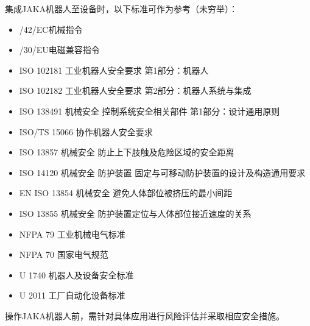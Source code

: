 \documentclass[a4paper,11pt,english,openany,oneside]{sphinxmanual}
\begin{document}
\sphinxAtStartPar
集成JAKA机器人至设备时，以下标准可作为参考（未穷举）：
\begin{itemize}
\item {} 
/42/EC机械指令

\item {} 
/30/EU电磁兼容指令

\item {} 
\sphinxAtStartPar
ISO 10218\sphinxhyphen{}1 工业机器人安全要求 第1部分：机器人

\item {} 
\sphinxAtStartPar
ISO 10218\sphinxhyphen{}2 工业机器人安全要求 第2部分：机器人系统与集成

\item {} 
\sphinxAtStartPar
ISO 13849\sphinxhyphen{}1 机械安全 控制系统安全相关部件 第1部分：设计通用原则

\item {} 
\sphinxAtStartPar
ISO/TS 15066 协作机器人安全要求

\item {} 
\sphinxAtStartPar
ISO 13857 机械安全 防止上下肢触及危险区域的安全距离

\item {} 
\sphinxAtStartPar
ISO 14120 机械安全 防护装置 固定与可移动防护装置的设计及构造通用要求

\item {} 
\sphinxAtStartPar
EN ISO 13854 机械安全 避免人体部位被挤压的最小间距

\item {} 
\sphinxAtStartPar
ISO 13855 机械安全 防护装置定位与人体部位接近速度的关系

\item {} 
\sphinxAtStartPar
NFPA 79 工业机械电气标准

\item {} 
\sphinxAtStartPar
NFPA 70 国家电气规范

\item {} 
\sphinxAtStartPar
U\sphinxhyphen{} 1740 机器人及设备安全标准

\item {} 
\sphinxAtStartPar
U\sphinxhyphen{} 2011 工厂自动化设备标准

\end{itemize}

\sphinxAtStartPar
操作JAKA机器人前，需针对具体应用进行风险评估并采取相应安全措施。
\end{document}

